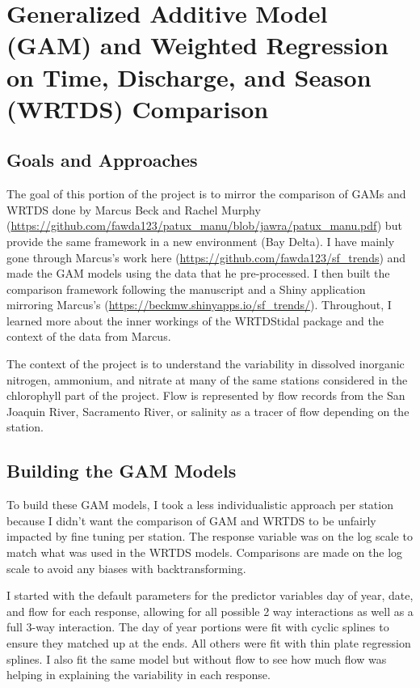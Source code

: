 \documentclass[12pt]{amsart}
\begin{document}
\section{Generalized Additive Model (GAM) and Weighted Regression on Time, Discharge, and Season (WRTDS) Comparison}

\subsection{Goals and Approaches}
The goal of this portion of the project is to mirror the comparison of GAMs and WRTDS done by Marcus Beck and Rachel Murphy (\url{https://github.com/fawda123/patux_manu/blob/jawra/patux_manu.pdf}) but provide the same framework in a new environment (Bay Delta). I have mainly gone through Marcus's work here (\url{https://github.com/fawda123/sf_trends}) and made the GAM models using the data that he pre-processed. I then built the comparison framework following the manuscript and a Shiny application mirroring Marcus's (\url{https://beckmw.shinyapps.io/sf_trends/}). Throughout, I learned more about the inner workings of the WRTDStidal package and the context of the data from Marcus.

The context of the project is to understand the variability in dissolved inorganic nitrogen, ammonium, and nitrate at many of the same stations considered in the chlorophyll part of the project. Flow is represented by flow records from the San Joaquin River, Sacramento River, or salinity as a tracer of flow depending on the station.

\subsection{Building the GAM Models}

To build these GAM models, I took a less individualistic approach per station because I didn't want the comparison of GAM and WRTDS to be unfairly impacted by fine tuning per station. The response variable was on the log scale to match what was used in the WRTDS models. Comparisons are made on the log scale to avoid any biases with backtransforming.

I started with the default parameters for the predictor variables day of year, date, and flow for each response, allowing for all possible 2 way interactions as well as a full 3-way interaction. The day of year portions were fit with cyclic splines to ensure they matched up at the ends. All others were fit with thin plate regression splines. I also fit the same model but without flow to see how much flow was helping in explaining the variability in each response. 
\end{document}
